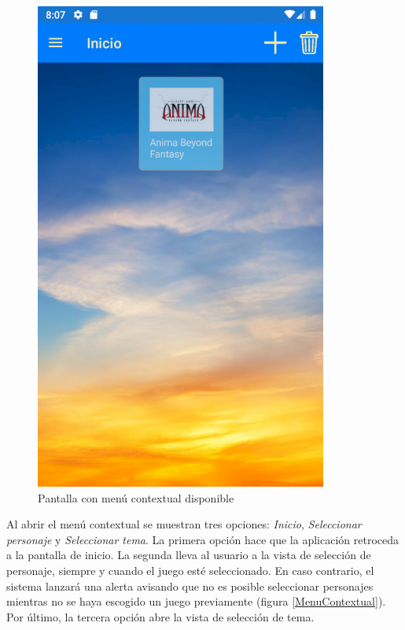 \begin{figure}[H]
    \centering
    \includegraphics[scale=0.3]{Figures/Capturas/PantallaInicio.png}
    \caption{Pantalla con menú contextual disponible}
    \label{MenuContextualOculto}    
\end{figure}

Al abrir el menú contextual se muestran tres opciones: \textit{Inicio}, \textit{Seleccionar personaje} y 
\textit{Seleccionar tema}. La primera opción hace que la aplicación retroceda a la pantalla de inicio.
La segunda lleva al usuario a la vista de selección de personaje, siempre y cuando el juego esté seleccionado. 
En caso contrario, el sistema lanzará una alerta avisando que no es posible seleccionar personajes mientras no 
se haya escogido un juego previamente (figura \ref*{MenuContextual}). Por último, la tercera opción abre la vista de 
selección de tema.

